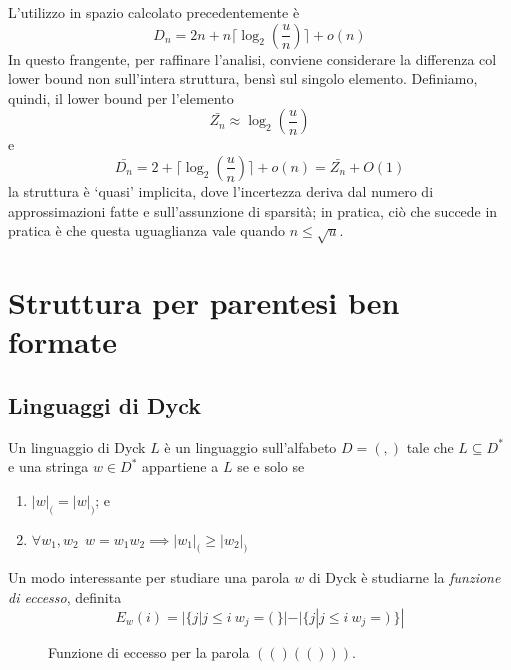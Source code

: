 L'utilizzo in spazio calcolato precedentemente è
$$
	D_n = 2n + n \lceil \log_2(\frac{u}{n}) \rceil + o(n)
$$
In questo frangente, per raffinare l'analisi, conviene considerare la differenza
col lower bound non sull'intera struttura, bensì sul singolo elemento.
Definiamo, quindi, il lower bound per l'elemento
$$
	\bar{Z_n} \approx \log_2(\frac{u}{n})
$$
e
$$
	\bar{D_n} = 2+ \lceil \log_2(\frac{u}{n}) \rceil + o(n) = \bar{Z_n} + O(1)
$$
la struttura è `quasi' implicita, dove l'incertezza deriva dal numero di
approssimazioni fatte e sull'assunzione di sparsità; in pratica, ciò che succede
in pratica è che questa uguaglianza vale quando $n \leq \sqrt{u}$.

\section{Struttura per parentesi ben formate}
\subsection{Linguaggi di Dyck}
Un linguaggio di Dyck $L$ è un linguaggio sull'alfabeto $D={(,)}$ tale che $L\subseteq D^*$
e una stringa $w \in D^*$ appartiene a $L$ se e solo se
\begin{enumerate}
	\item $|w|_{(} = |w|_{)}$; e
	\item $\forall w_1, w_2 ~~ w = w_1w_2 \implies|w_1|_{(} \geq |w_2|_{)}$
\end{enumerate}
Un modo interessante per studiare una parola $w$ di Dyck è studiarne la
\textit{funzione di eccesso}, definita
$$
	E_w(i) = |\{j | j \le i ~ w_j = ( ~\}| - |\{j | j \leq i ~ w_j = ) ~\}|
$$
\begin{figure}[h]
	\centering
	\caption{Funzione di eccesso per la parola $(()(()))$.}
	\label{fig:func_excess}
\end{figure}

